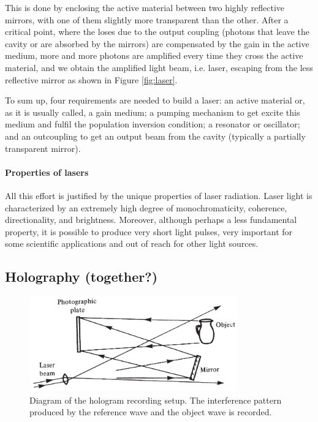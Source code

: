 \documentclass[11pt,a4paper]{article}
\begin{document}
This is done by enclosing the active material between two highly reflective mirrors, with one of them slightly more transparent than the other. After a critical point, where the loses due to the output coupling (photons that leave the cavity or are absorbed by the mirrors) are compensated by the gain in the active medium, more and more photons are amplified every time they cross the active material, and we obtain the amplified light beam, i.e. laser, escaping from the less reflective mirror as shown in Figure \ref{fig:laser}.

To sum up, four requirements are needed to build a laser: an active material or, as it is usually called, a gain medium; a pumping mechanism to get excite this medium and fulfil the population inversion condition; a resonator or oscillator; and an outcoupling to get an output beam from the cavity (typically a partially transparent mirror).

\paragraph{Properties of lasers} All this effort is justified by the unique properties of laser radiation. Laser light is characterized by an extremely high degree of monochromaticity,  coherence, directionality, and brightness. Moreover, although perhaps a less fundamental property, it is possible to produce very short light pulses, very important for some scientific applications and out of reach for other light sources.




\subsection{Holography (together?)}\label{sec:Holo}

\begin{figure}[ht]
\centering
\includegraphics[width=0.8\textwidth]{Hologram_recording}
\caption{Diagram of the hologram recording setup. The interference pattern produced by the reference wave and the object wave is recorded.\cite{hariharan_2002}}
\label{fig:hologram_recording}
\end{figure}
\end{document}
